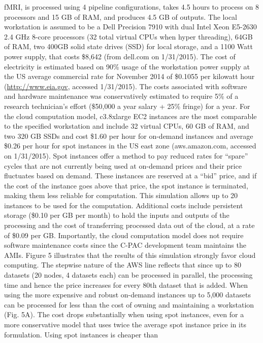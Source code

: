 \documentclass[1p,11pt]{elsarticle}
\begin{document}
fMRI, is processed using 4 pipeline configurations, takes 4.5 hours to
process on 8 processors and 15 GB of RAM, and produces 4.5 GB of
outputs. The local workstation is assumed to be a Dell Precision 7910
with dual Intel Xeon E5-2630 2.4 GHz 8-core processors (32 total virtual
CPUs when hyper threading), 64GB of RAM, two 400GB solid state drives
(SSD) for local storage, and a 1100 Watt power supply, that costs \$8,642
(from dell.com on 1/31/2015). The cost of electricity is estimated based
on 90\% usage of the workstation power supply at the US average
commercial rate for November 2014 of \$0.1055 per kilowatt hour
(\url{http://www.eia.gov}, accessed 1/31/2015). The costs associated with
software and hardware maintenance was conservatively estimated to
require 5\% of a research technician’s effort (\$50,000 a year salary +
25\% fringe) for a year.  For the cloud computation model, c3.8xlarge EC2
instances are the most comparable to the specified workstation and
include 32 virtual CPUs, 60 GB of RAM, and two 320 GB SSDs and cost
\$1.60 per hour for on-demand instances and average \$0.26 per hour for
spot instances in the US east zone (aws.amazon.com, accessed on
1/31/2015). Spot instances offer a method to pay reduced rates for
“spare” cycles that are not currently being used at on-demand prices and
their price fluctuates based on demand. These instances are reserved at
a “bid” price, and if the cost of the instance goes above that price,
the spot instance is terminated, making them less reliable for
computation. This simulation allows up to 20 instances to be used for
the computation. Additional costs include persistent storage (\$0.10 per
GB per month) to hold the inputs and outputs of the processing and the
cost of transferring processed data out of the cloud, at a rate of \$0.09
per GB. Importantly, the cloud computation model does not require
software maintenance costs since the C-PAC development team maintains
the AMIs.  Figure 5 illustrates that the results of this simulation
strongly favor cloud computing. The stepwise nature of the AWS line
reflects that since up to 80 datasets (20 nodes, 4 datasets each) can be
processed in parallel, the processing time and hence the price increases
for every 80th dataset that is added. When using the more expensive and
robust on-demand instances up to 5,000 datasets can be processed
for less than the cost of owning and maintaining a workstation
(Fig. 5A). The cost drops substantially when using spot
instances, even for a more conservative model that uses
twice the average spot instance price in its
formulation. Using spot instances is cheaper than
\end{document}

